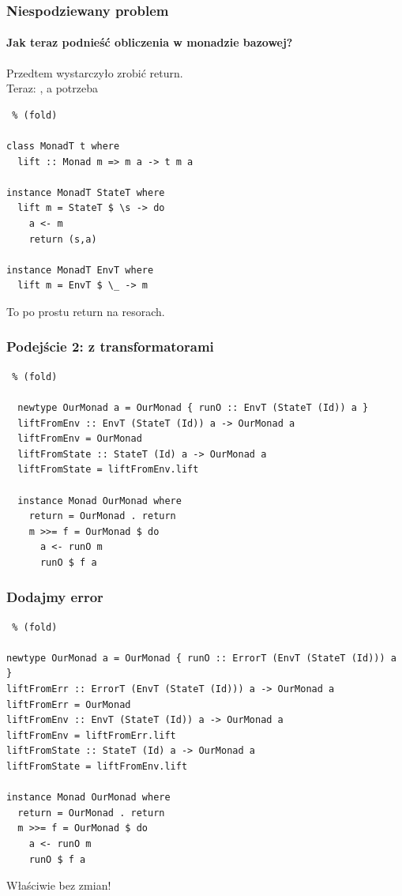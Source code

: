 \documentclass{beamer}
\begin{document}
\begin{frame}[fragile] %
  \frametitle{Niespodziewany problem}
  \framesubtitle{Jak teraz podnieść obliczenia w monadzie bazowej?}
    Przedtem wystarczyło zrobić return.\\
    Teraz: , a potrzeba 
  \begin{lstlisting} % (fold)

class MonadT t where
  lift :: Monad m => m a -> t m a

instance MonadT StateT where
  lift m = StateT $ \s -> do
    a <- m
    return (s,a)

instance MonadT EnvT where
  lift m = EnvT $ \_ -> m

  \end{lstlisting}
  To po prostu return na resorach.
\end{frame}

\begin{frame}[fragile] %
  \frametitle{Podejście 2: z transformatorami}
  \begin{lstlisting} % (fold)

  newtype OurMonad a = OurMonad { runO :: EnvT (StateT (Id)) a } 
  liftFromEnv :: EnvT (StateT (Id)) a -> OurMonad a
  liftFromEnv = OurMonad
  liftFromState :: StateT (Id) a -> OurMonad a
  liftFromState = liftFromEnv.lift

  instance Monad OurMonad where
    return = OurMonad . return 
    m >>= f = OurMonad $ do
      a <- runO m
      runO $ f a

  \end{lstlisting}
\end{frame}

\begin{frame}[fragile] %
  \frametitle{Dodajmy error}
  \begin{lstlisting} % (fold)

newtype OurMonad a = OurMonad { runO :: ErrorT (EnvT (StateT (Id))) a } 
liftFromErr :: ErrorT (EnvT (StateT (Id))) a -> OurMonad a
liftFromErr = OurMonad 
liftFromEnv :: EnvT (StateT (Id)) a -> OurMonad a
liftFromEnv = liftFromErr.lift
liftFromState :: StateT (Id) a -> OurMonad a
liftFromState = liftFromEnv.lift

instance Monad OurMonad where
  return = OurMonad . return 
  m >>= f = OurMonad $ do
    a <- runO m
    runO $ f a

  \end{lstlisting}
  Właściwie bez zmian!
\end{frame}
\end{document}
